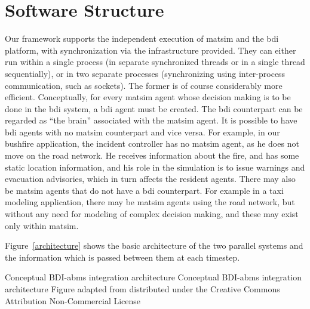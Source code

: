 \section{Software Structure}
\label{sec:bdi-structure}
Our framework supports the independent execution of \gls{matsim} and the \gls{bdi} platform, with 
synchronization via the infrastructure provided.
They can either run within a single process (in
separate synchronized threads or in a single thread sequentially), or in two
separate processes (synchronizing using inter-process communication, such as
sockets). The former is of course considerably more efficient. 
%
Conceptually, for every \gls{matsim} agent whose decision making is to be
done in the \gls{bdi} system, a \gls{bdi} agent must be created. The \gls{bdi} counterpart can
be regarded as ``the brain'' associated with the \gls{matsim} agent. It is
possible to have \gls{bdi} agents with no \gls{matsim} counterpart and vice
versa. For example, in our bushfire application, the incident
controller has no \gls{matsim} agent, as he does not move on the road
network. He receives information about the fire, and has some static
location information, and his role in the simulation is to issue
warnings and evacuation advisories, which in turn affects the resident
agents. There may also be \gls{matsim} agents that do not have a \gls{bdi}
counterpart. For example in a taxi modeling application, there may be
\gls{matsim} agents using the road network, but without any need for
modeling of complex decision making, and these may exist only within
\gls{matsim}. 

Figure~\ref{architecture} shows the basic architecture of the
two parallel systems and the information which is passed between them
at each timestep.

%

\createfigure%
{Conceptual BDI-\gls{abms} integration architecture}%
{Conceptual BDI-\gls{abms} integration architecture}%
{\label{architecture}}%
{\resizebox{0.75\textwidth}{!}{}}%
{Figure adapted from \citet[][Figure~1]{ecai} distributed under the Creative Commons Attribution Non-Commercial License}

